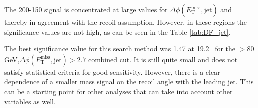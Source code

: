 The 200-150 signal is concentrated at large values for $\Delta\phi(E^{\text{miss}}_{\text{T}},\text{jet})$ and thereby in agreement with the recoil assumption. However, in these regions the significance values are not high, as can be seen in the Table \ref{tab:DF_jet}.
 
The best significance value for this search method was 1.47 at 19.2 \invfb \, for the \met$>$80 GeV,$\Delta\phi(E^{\text{miss}}_{\text{T}},\text{jet})>2.7$ combined cut. It is still quite small and does not satisfy statistical criteria for good sensitivity. However, there is a clear dependence of a smaller mass signal on the recoil angle with the leading jet. This can be a starting point for other analyses that can take into account other variables as well. 









